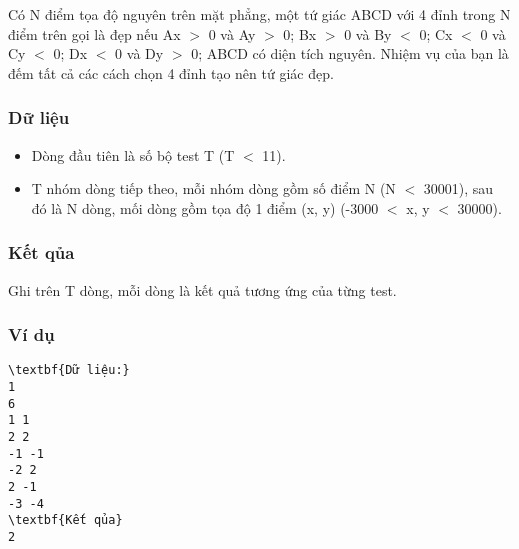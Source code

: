 



   Có N điểm tọa độ nguyên trên mặt phẳng, một tứ giác ABCD với 4 đỉnh trong N điểm trên gọi là đẹp nếu     Ax $>$ 0 và Ay $>$ 0;     Bx $>$ 0 và By $<$ 0;     Cx $<$ 0 và Cy $<$ 0;     Dx $<$ 0 và Dy $>$ 0;     ABCD có diện tích nguyên. Nhiệm vụ của bạn là đếm tất cả các cách chọn 4 đỉnh tạo nên tứ giác đẹp.  

\subsubsection{   Dữ liệu  }
\begin{itemize}
	\item     Dòng đầu tiên là số bộ test T (T $<$ 11).   
	\item     T nhóm dòng tiếp theo, mỗi nhóm dòng gồm số điểm N (N $<$ 30001), sau đó là N dòng, mối dòng gồm tọa độ 1 điểm (x, y) (-3000 $<$ x, y $<$ 30000).   
\end{itemize}

\subsubsection{   Kết qủa  }

   Ghi trên T dòng, mỗi dòng là kết quả tương ứng của từng test.  

\subsubsection{   Ví dụ  }
\begin{verbatim}
\textbf{Dữ liệu:} 
1
6
1 1
2 2
-1 -1
-2 2
2 -1
-3 -4
\textbf{Kết qủa} 
2 
\end{verbatim}